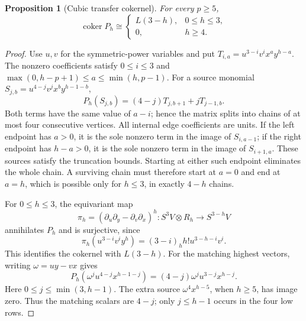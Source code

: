 \documentclass[11pt]{article}
\theoremstyle{plain}
\newtheorem{proposition}[proposition]{Proposition}
\theoremstyle{definition}
\theoremstyle{remark}
\numberwithin{equation}{section}
\newcommand{\coker}{\operatorname{coker}}
\begin{document}
\begin{proposition}[Cubic transfer cokernel]\label{prop:cubic-transfer}
For every $p\ge5$,
\[
 \coker P_h\cong
 \begin{cases}
 L(3-h),&0\le h\le3,\\
 0,&h\ge4.
 \end{cases}
\]
\end{proposition}

\begin{proof}
Use $u,v$ for the symmetric-power variables and put
$T_{i,a}=u^{3-i}v^ix^ay^{h-a}$.
The nonzero coefficients satisfy
$0\le i\le3$ and $\max(0,h-p+1)\le a\le\min(h,p-1)$.
For a source monomial $S_{j,b}=u^{4-j}v^jx^by^{h-1-b}$,
\[
 P_h(S_{j,b})=(4-j)T_{j,b+1}+jT_{j-1,b}.
\]
Both terms have the same value of $a-i$; hence the matrix splits
into chains of at most four consecutive vertices. All internal
edge coefficients are units. If the left endpoint has $a>0$,
it is the sole nonzero term in the image of $S_{i,a-1}$; if the
right endpoint has $h-a>0$, it is the sole nonzero term in the
image of $S_{i+1,a}$. These sources satisfy the truncation bounds.
Starting at either such endpoint eliminates the whole chain.
A surviving chain must therefore start at $a=0$ and end at $a=h$,
which is possible only for $h\le3$, in exactly $4-h$ chains.

For $0\le h\le3$, the equivariant map
\[
 \pi_h=(\partial_u\partial_y-\partial_v\partial_x)^h
 :S^3V\otimes R_h\longrightarrow S^{3-h}V
\]
annihilates $P_h$ and is surjective, since
\[
 \pi_h(u^{3-i}v^iy^h)=(3-i)_h h!u^{3-h-i}v^i.
\]
This identifies the cokernel with $L(3-h)$.
For the matching highest vectors, writing $\omega=uy-vx$ gives
\[
 P_h(\omega^ju^{4-j}x^{h-1-j})
 =(4-j)\omega^ju^{3-j}x^{h-j}.
\]
Here $0\le j\le\min(3,h-1)$. The extra source
$\omega^4x^{h-5}$, when $h\ge5$, has image zero.
Thus the matching scalars are $4-j$; only $j\le h-1$ occurs
in the four low rows.
\end{proof}
\end{document}
